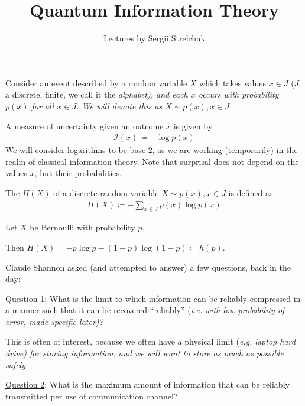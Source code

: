 \documentclass[]{article}
\title{Quantum Information Theory}
\author{Lectures by Sergii Strelchuk}
\date{}
\begin{document}
\maketitle


\begin{defin*}[Surprisal]
    Consider an event described by a random variable $X$ which takes values $x \in J$ ($J$ a discrete, finite, we call it the \it{alphabet}), and each $x$ occurs with probability $p(x)$ for all $x \in J$. We will denote this as $X\sim p(x),x\in J$.

    A measure of uncertainty given an outcome $x$ is given by :
    \begin{align*}
        \mathcal{I}(x)\coloneqq -\log p(x)
    \end{align*}
    We will consider logarithms to be base 2, as we are working (temporarily) in the realm of classical information theory. Note that surprisal does not depend on the values $x$, but their probabilities.
\end{defin*}

\begin{defin*}
    The  $H(X)$ of a discrete random variable $X\sim p(x),x\in J$ is defined as:
    \begin{align*}
        H(X) \coloneqq -\sum_{x\in J}p(x)\log p(x)
    \end{align*}
\end{defin*}

\begin{remark*}
    Let $X$ be Bernoulli with probability $p$.

    Then $H(X) = -p\log p - (1-p)\log(1-p) \coloneqq h(p)$.
\end{remark*}

Claude Shannon asked (and attempted to answer) a few questions, back in the day:

\underline{Question 1}: What is the limit to which information can be reliably compressed in a manner such that it can be recovered ``reliably'' (\it{i.e.} with low probability of error, made specific later)?

This is often of interest, because we often have a physical limit (\it{e.g.} laptop hard drive) for storing information, and we will want to store as much as possible safely.

\underline{Question 2}: What is the maximum amount of information that can be reliably transmitted per use of communication channel?
\end{document}
